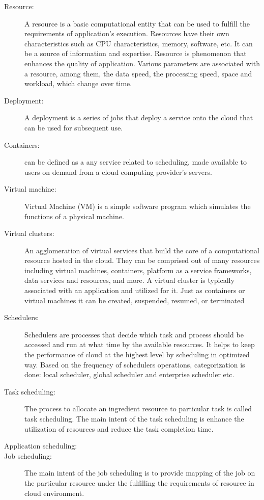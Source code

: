 \documentclass[final,5p,times,twocolumn]{elsarticle}
\begin{document}
\begin{description}

\item[Resource:] A resource is a basic computational entity that can
  be used to fulfill the requirements of application's execution.
  Resources have their own characteristics such as CPU
  characteristics, memory, software, etc. It can be a source of
  information and expertise. Resource is phenomenon that enhances the
  quality of application. Various parameters are associated with a
  resource, among them, the data speed, the processing speed, space
  and workload, which change over time.

\item[Deployment:] A deployment is a series of jobs that deploy a
  service onto the cloud that can be used for subsequent use.

\item[Containers:] can be defined as a any service related to
  scheduling, made available to users on demand from a cloud computing
  provider's servers.

\item[Virtual machine:] Virtual Machine (VM) is a simple software
  program which simulates the functions of a physical machine.

\item[Virtual clusters:] An agglomeration of virtual services that
  build the core of a computational resource hosted in the cloud. They
  can be comprised out of many resources including virtual machines,
  containers, platform as a service frameworks, data services and
  resources, and more. A virtual cluster is typically associated with
  an application and utilized for it. Just as containers or virtual
  machines it can be created, suspended, resumed, or terminated

\item[Schedulers:] Schedulers are processes that decide which task and
  process should be accessed and run at what time by the available
  resources. It helps to keep the performance of cloud at the highest
  level by scheduling in optimized way. Based on the frequency of
  schedulers operations, categorization is done: local scheduler,
  global scheduler and enterprise scheduler etc.
  
\item[Task scheduling:] The process to allocate an ingredient resource
  to particular task is called task scheduling. The main intent of the
  task scheduling is enhance the utilization of resources and reduce
  the task completion time.
  
  
\item[Application scheduling:]
  
\item[Job scheduling:] The main intent of the job scheduling is to
  provide mapping of the job on the particular resource under the
  fulfilling the requirements of resource in cloud environment.
\end{description}
\color{black}
\end{document}
